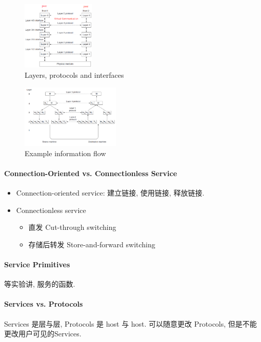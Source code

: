 \begin{figure}[!htb]
    \centering
    \includegraphics[width=0.309\textwidth]{pic/CN1/Layers}
    \caption{Layers, protocols and interfaces}
\end{figure}

\begin{figure}[!htb]
    \centering
    \includegraphics[width=0.42\textwidth]{pic/CN1/information flow}
    \caption{Example information flow}
\end{figure}

\paragraph{Connection-Oriented vs. Connectionless Service}\quad

\begin{itemize}
    \item Connection-oriented service: 建立链接, 使用链接, 释放链接. 
    \item Connectionless service
    \begin{itemize}
        \item 直发 Cut-through switching
        \item 存储后转发 Store-and-forward switching
    \end{itemize}
\end{itemize}

\paragraph{Service Primitives}等实验讲, 服务的函数. 

\paragraph{Services vs. Protocols}Services 是层与层, Protocols 是 host 与 host. 可以随意更改 Protocols, 但是不能更改用户可见的Services. 

